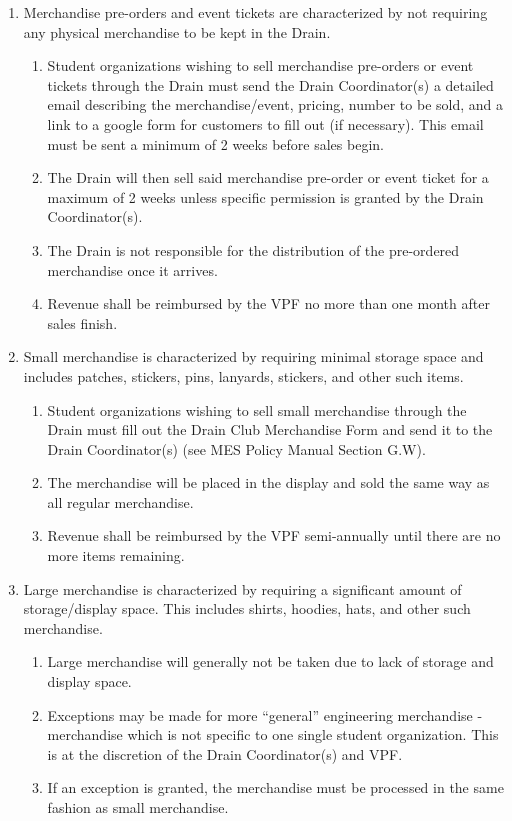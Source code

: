 \begin{enumerate}
 \item
  Merchandise pre-orders and event tickets are characterized by not
  requiring any physical merchandise to be kept in the Drain.

  \begin{enumerate}
   \item
    Student organizations wishing to sell merchandise pre-orders or
    event tickets through the Drain must send the Drain Coordinator(s) a
    detailed email describing the merchandise/event, pricing, number to
    be sold, and a link to a google form for customers to fill out (if
    necessary). This email must be sent a minimum of 2 weeks before
    sales begin.
   \item
    The Drain will then sell said merchandise pre-order or event ticket
    for a maximum of 2 weeks unless specific permission is granted by
    the Drain Coordinator(s).
   \item
    The Drain is not responsible for the distribution of the pre-ordered
    merchandise once it arrives.
   \item
    Revenue shall be reimbursed by the VPF no more than one month after
    sales finish.
  \end{enumerate}
 \item
  Small merchandise is characterized by requiring minimal storage space
  and includes patches, stickers, pins, lanyards, stickers, and other
  such items.

  \begin{enumerate}
   \item
    Student organizations wishing to sell small merchandise through the
    Drain must fill out the Drain Club Merchandise Form and send it to
    the Drain Coordinator(s) (see MES Policy Manual Section G.W).
   \item
    The merchandise will be placed in the display and sold the same way
    as all regular merchandise.
   \item
    Revenue shall be reimbursed by the VPF semi-annually until there are
    no more items remaining.
  \end{enumerate}
 \item
  Large merchandise is characterized by requiring a significant amount
  of storage/display space. This includes shirts, hoodies, hats, and
  other such merchandise.

  \begin{enumerate}
   \item
    Large merchandise will generally not be taken due to lack of storage
    and display space.
   \item
    Exceptions may be made for more ``general'' engineering merchandise
    - merchandise which is not specific to one single student
    organization. This is at the discretion of the Drain Coordinator(s)
    and VPF.
   \item
    If an exception is granted, the merchandise must be processed in the
    same fashion as small merchandise.
  \end{enumerate}
\end{enumerate}

